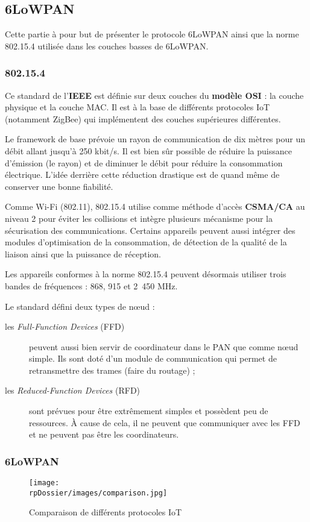 
\subsection{6LoWPAN}

Cette partie à pour but de présenter le protocole 6LoWPAN ainsi que la norme 802.15.4 utilisée dans les couches basses de 6LoWPAN.

\subsubsection{802.15.4}

Ce standard de l'\textbf{IEEE} est définie sur deux couches du \textbf{modèle OSI} : la couche physique et la couche MAC. Il est à la base de différents protocoles IoT (notamment ZigBee) qui implémentent des couches supérieures différentes. 

Le framework de base prévoie un rayon de communication de dix mètres pour un débit allant jusqu'à 250 kbit/s. Il est bien sûr possible de réduire la puissance d'émission (le rayon) et de diminuer le débit pour réduire la consommation électrique. L'idée derrière cette réduction drastique est de quand même de conserver une bonne fiabilité.

Comme Wi-Fi (802.11), 802.15.4 utilise comme méthode d’accès \textbf{CSMA/CA} au niveau 2 pour éviter les collisions et intègre plusieurs mécanisme pour la sécurisation des communications. Certains appareils peuvent aussi intégrer des modules d'optimisation de la consommation, de détection de la qualité de la liaison ainsi que la puissance de réception. 

Les appareils conformes à la norme 802.15.4 peuvent désormais utiliser trois bandes de fréquences : 868, 915 et 2~450 MHz.

Le standard défini deux types de nœud :

\begin{description}
	\item[les \textit{Full-Function Devices} (FFD)] peuvent aussi bien servir de coordinateur dans le PAN que comme nœud simple. Ils sont doté d'un module de communication qui permet de retransmettre des trames (faire du routage) ;
	\item[les \textit{Reduced-Function Devices} (RFD)] sont prévues pour être extrêmement simples et possèdent peu de ressources. À cause de cela, il ne peuvent que communiquer avec les FFD et ne peuvent pas être les coordinateurs.
\end{description}

\subsubsection{6LoWPAN}



\begin{figure}[h]
\centering
\texttt{[image: \\rpDossier/images/comparison.jpg]}
\caption{Comparaison de différents protocoles IoT}
\label{comparison}
\end{figure}
